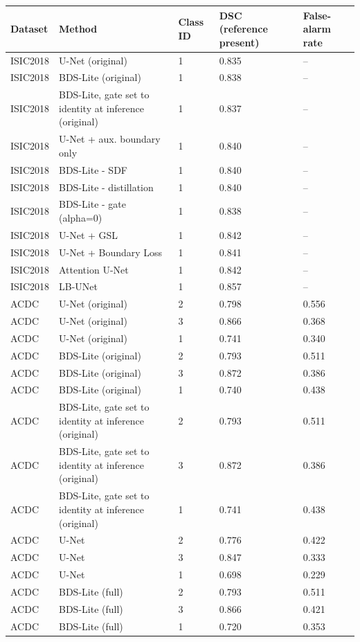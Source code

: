 \begin{longtable}{lllll}
\toprule
Dataset & Method & Class ID & DSC (reference present) & False-alarm rate \\
\midrule
ISIC2018 & U-Net (original) & 1 & 0.835 & -- \\
ISIC2018 & BDS-Lite (original) & 1 & 0.838 & -- \\
ISIC2018 & BDS-Lite, gate set to identity at inference (original) & 1 & 0.837 & -- \\
ISIC2018 & U-Net + aux. boundary only & 1 & 0.840 & -- \\
ISIC2018 & BDS-Lite - SDF & 1 & 0.840 & -- \\
ISIC2018 & BDS-Lite - distillation & 1 & 0.840 & -- \\
ISIC2018 & BDS-Lite - gate (alpha=0) & 1 & 0.838 & -- \\
ISIC2018 & U-Net + GSL & 1 & 0.842 & -- \\
ISIC2018 & U-Net + Boundary Loss & 1 & 0.841 & -- \\
ISIC2018 & Attention U-Net & 1 & 0.842 & -- \\
ISIC2018 & LB-UNet & 1 & 0.857 & -- \\
ACDC & U-Net (original) & 2 & 0.798 & 0.556 \\
ACDC & U-Net (original) & 3 & 0.866 & 0.368 \\
ACDC & U-Net (original) & 1 & 0.741 & 0.340 \\
ACDC & BDS-Lite (original) & 2 & 0.793 & 0.511 \\
ACDC & BDS-Lite (original) & 3 & 0.872 & 0.386 \\
ACDC & BDS-Lite (original) & 1 & 0.740 & 0.438 \\
ACDC & BDS-Lite, gate set to identity at inference (original) & 2 & 0.793 & 0.511 \\
ACDC & BDS-Lite, gate set to identity at inference (original) & 3 & 0.872 & 0.386 \\
ACDC & BDS-Lite, gate set to identity at inference (original) & 1 & 0.741 & 0.438 \\
ACDC & U-Net & 2 & 0.776 & 0.422 \\
ACDC & U-Net & 3 & 0.847 & 0.333 \\
ACDC & U-Net & 1 & 0.698 & 0.229 \\
ACDC & BDS-Lite (full) & 2 & 0.793 & 0.511 \\
ACDC & BDS-Lite (full) & 3 & 0.866 & 0.421 \\
ACDC & BDS-Lite (full) & 1 & 0.720 & 0.353 \\

\end{longtable}
